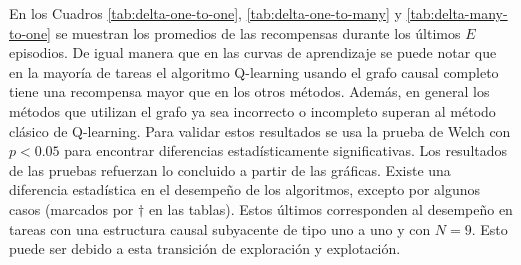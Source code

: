 En los Cuadros \ref{tab:delta-one-to-one}, \ref{tab:delta-one-to-many} y \ref{tab:delta-many-to-one} se muestran
los promedios de las recompensas durante los últimos $E$ episodios. 
De igual manera que en las curvas de aprendizaje se puede notar que en la mayoría de tareas el algoritmo Q-learning usando el grafo causal completo tiene una recompensa mayor que en los otros métodos. Además, en general los métodos que utilizan el grafo ya sea incorrecto o incompleto superan al método clásico de Q-learning. Para validar estos resultados se usa la prueba de Welch con $p < 0.05$ para encontrar diferencias estadísticamente significativas. 
Los resultados de las pruebas refuerzan lo concluido a partir de las gráficas. Existe una diferencia estadística en el desempeño de los algoritmos, excepto por algunos casos (marcados por $\dagger$ en las tablas). Estos últimos corresponden
al desempeño en tareas con una estructura causal subyacente de tipo uno a uno y con $N=9$. Esto puede ser debido a esta transición
de exploración y explotación. 

